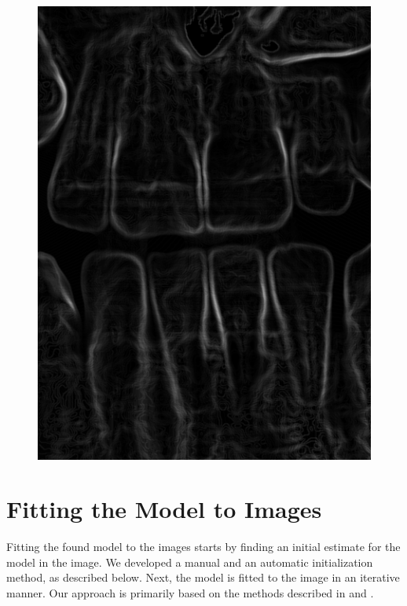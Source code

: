 \documentclass[11pt]{article}
\begin{document}
\begin{figure}[H]
\begin{minipage}{.30\textwidth}
  \includegraphics[width=\linewidth]{SOBELcropped}
  \captionsetup{justification=centering}
  \label{fig:sobel}
\end{minipage}
\end{figure}

\section{Fitting the Model to Images}
Fitting the found model to the images starts by finding an initial estimate for the model in the image. We developed a manual and an automatic initialization method, as described below. Next, the model is fitted to the image in an iterative manner. Our approach is primarily based on the methods described in \cite{cootes2000introduction} and \cite{cootestraining}.
\end{document}

